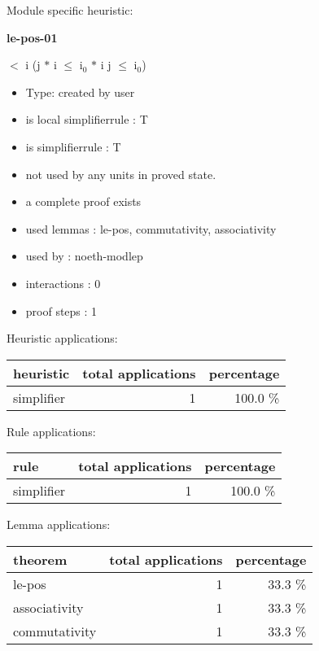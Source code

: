 \documentclass[a4paper]{article}
\begin{document}
Module specific heuristic:

\pagebreak

{\LARGE\bf le-pos-01}\label{lemma-le-pos-01}

\medskip

  $<$ i \Imp (j $*$ i $\le$ $\mbox{i}_{0}$ $*$ i \Equiv j $\le$ $\mbox{i}_{0}$)

\begin{itemize}

\item Type: created by user

\item is local simplifierrule : T
\item is simplifierrule : T
\item not used by any units in proved state.
\item       a complete proof exists
\item       used lemmas  : le-pos, commutativity, associativity
\item       used by      : noeth-modlep
\item       interactions : 0
\item       proof steps  : 1
\end{itemize}

\medskip


Heuristic applications:

\begin{supertabular}{l|r|r}
heuristic	& total applications & percentage \\ \hline
simplifier & 1 & 100.0 \% \\

\end{supertabular}

Rule applications:

\begin{supertabular}{l|r|r}
rule	        & total applications & percentage \\ \hline
simplifier & 1 & 100.0 \% \\

\end{supertabular}

Lemma applications:

\begin{supertabular}{l|r|r}
theorem	        & total applications & percentage \\ \hline
le-pos & 1 & 33.3 \% \\
associativity & 1 & 33.3 \% \\
commutativity & 1 & 33.3 \% \\

\end{supertabular}
\end{document}
